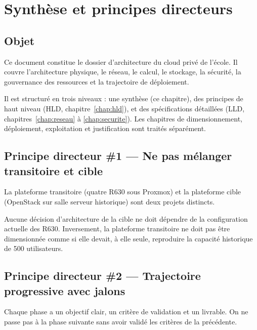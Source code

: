 \chapter{Synthèse et principes directeurs}
\label{chap:synthese}

\section{Objet}
Ce document constitue le dossier d'architecture du cloud privé de l'école. Il couvre l'architecture physique, le réseau, le calcul, le stockage, la sécurité, la gouvernance des ressources et la trajectoire de déploiement.

Il est structuré en trois niveaux : une synthèse (ce chapitre), des principes de haut niveau (HLD, chapitre~\ref{chap:hld}), et des spécifications détaillées (LLD, chapitres~\ref{chap:reseau} à \ref{chap:securite}). Les chapitres de dimensionnement, déploiement, exploitation et justification sont traités séparément.

\section{Principe directeur \#1 — Ne pas mélanger transitoire et cible}
La plateforme transitoire (quatre R630 sous Proxmox) et la plateforme cible (OpenStack sur salle serveur historique) sont deux projets distincts.

\begin{infobox}
Aucune décision d'architecture de la cible ne doit dépendre de la configuration actuelle des R630. Inversement, la plateforme transitoire ne doit pas être dimensionnée comme si elle devait, à elle seule, reproduire la capacité historique de 500 utilisateurs.
\end{infobox}

\section{Principe directeur \#2 — Trajectoire progressive avec jalons}
Chaque phase a un objectif clair, un critère de validation et un livrable. On ne passe pas à la phase suivante sans avoir validé les critères de la précédente.


